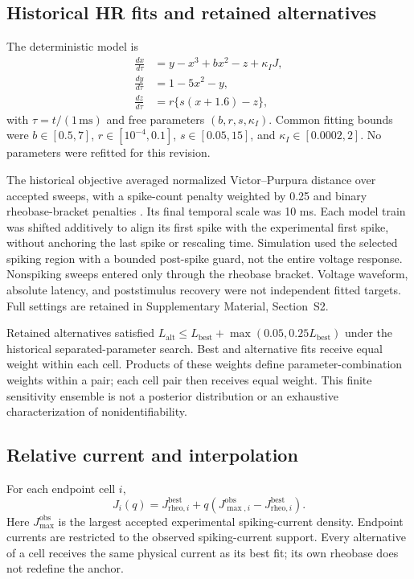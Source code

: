 \documentclass[utf8]{FrontiersinHarvard}
\newcommand{\sref}[1]{Supplementary Material, Section~#1}
\begin{document}
\subsection{Historical HR fits and retained alternatives}\label{sec:fit}
The deterministic model is
\begin{align}
\frac{dx}{d\tau}&=y-x^3+bx^2-z+\kappa_I J,\\
\frac{dy}{d\tau}&=1-5x^2-y,\\
\frac{dz}{d\tau}&=r\{s(x+1.6)-z\},
\end{align}
with $\tau=t/(1\,\mathrm{ms})$ and free parameters $(b,r,s,\kappa_I)$. Common fitting bounds were $b\in[0.5,7]$, $r\in[10^{-4},0.1]$, $s\in[0.05,15]$, and $\kappa_I\in[0.0002,2]$. No parameters were refitted for this revision.

The historical objective averaged normalized Victor--Purpura distance over accepted sweeps, with a spike-count penalty weighted by 0.25 and binary rheobase-bracket penalties \citep{victor1996}. Its final temporal scale was 10 ms. Each model train was shifted additively to align its first spike with the experimental first spike, without anchoring the last spike or rescaling time. Simulation used the selected spiking region with a bounded post-spike guard, not the entire voltage response. Nonspiking sweeps entered only through the rheobase bracket. Voltage waveform, absolute latency, and poststimulus recovery were not independent fitted targets. Full settings are retained in \sref{S2}.

Retained alternatives satisfied $L_{\mathrm{alt}}\leq L_{\mathrm{best}}+\max(0.05,0.25L_{\mathrm{best}})$ under the historical separated-parameter search. Best and alternative fits receive equal weight within each cell. Products of these weights define parameter-combination weights within a pair; each cell pair then receives equal weight. This finite sensitivity ensemble is not a posterior distribution or an exhaustive characterization of nonidentifiability.

\subsection{Relative current and interpolation}\label{sec:q}
For each endpoint cell $i$,
\begin{equation}
J_i(q)=J_{\mathrm{rheo},i}^{\mathrm{best}}+q\left(J_{\max,i}^{\mathrm{obs}}-J_{\mathrm{rheo},i}^{\mathrm{best}}\right).\label{eq:q}
\end{equation}
Here $J_{\max}^{\mathrm{obs}}$ is the largest accepted experimental spiking-current density. Endpoint currents are restricted to the observed spiking-current support. Every alternative of a cell receives the same physical current as its best fit; its own rheobase does not redefine the anchor.
\end{document}
